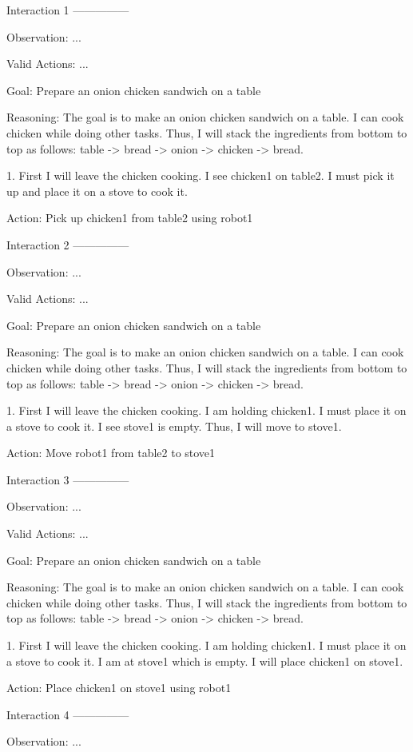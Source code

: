 Interaction 1
---------------


Observation: ...

Valid Actions: ...

Goal: Prepare an onion chicken sandwich on a table


Reasoning: The goal is to make an onion chicken sandwich on a table. I can cook chicken while doing other tasks. Thus, I
will stack the ingredients from bottom to top as follows: table -> bread -> onion -> chicken -> bread.

1. First I will leave the chicken cooking. I see chicken1 on table2. I must pick it up and place it on a stove to cook it.

Action: Pick up chicken1 from table2 using robot1


Interaction 2
---------------


Observation: ...

Valid Actions: ...

Goal: Prepare an onion chicken sandwich on a table


Reasoning: The goal is to make an onion chicken sandwich on a table. I can cook chicken while doing other tasks. Thus, I
will stack the ingredients from bottom to top as follows: table -> bread -> onion -> chicken -> bread.

1. First I will leave the chicken cooking. I am holding chicken1. I must place it on a stove to cook it. I see stove1 is empty. Thus, I will move to stove1.

Action: Move robot1 from table2 to stove1


Interaction 3
---------------


Observation: ...

Valid Actions: ...

Goal: Prepare an onion chicken sandwich on a table


Reasoning: The goal is to make an onion chicken sandwich on a table. I can cook chicken while doing other tasks. Thus, I
will stack the ingredients from bottom to top as follows: table -> bread -> onion -> chicken -> bread.

1. First I will leave the chicken cooking. I am holding chicken1. I must place it on a stove to cook it. I am at stove1 which is empty. I will place chicken1 on stove1.

Action: Place chicken1 on stove1 using robot1


Interaction 4
---------------


Observation: ...

